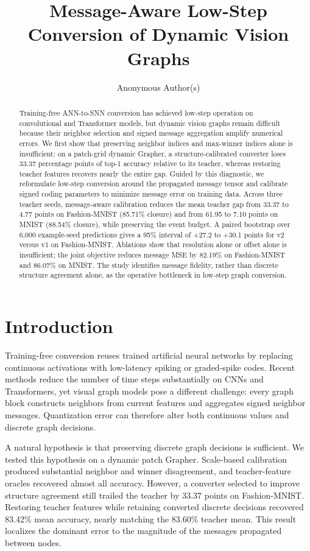 \documentclass[10pt,twocolumn]{article}
\title{Message-Aware Low-Step Conversion of Dynamic Vision Graphs}
\author{Anonymous Author(s)}
\begin{document}
\maketitle
\begin{abstract}
Training-free ANN-to-SNN conversion has achieved low-step operation on convolutional and Transformer models, but dynamic vision graphs remain difficult because their neighbor selection and signed message aggregation amplify numerical errors. We first show that preserving neighbor indices and max-winner indices alone is insufficient: on a patch-grid dynamic Grapher, a structure-calibrated converter loses 33.37 percentage points of top-1 accuracy relative to its teacher, whereas restoring teacher features recovers nearly the entire gap. Guided by this diagnostic, we reformulate low-step conversion around the propagated message tensor and calibrate signed coding parameters to minimize message error on training data. Across three teacher seeds, message-aware calibration reduces the mean teacher gap from 33.37 to 4.77 points on Fashion-MNIST (85.71\% closure) and from 61.95 to 7.10 points on MNIST (88.54\% closure), while preserving the event budget. A paired bootstrap over 6,000 example-seed predictions gives a 95\% interval of +27.2 to +30.1 points for v2 versus v1 on Fashion-MNIST. Ablations show that resolution alone or offset alone is insufficient; the joint objective reduces message MSE by 82.19\% on Fashion-MNIST and 86.07\% on MNIST. The study identifies message fidelity, rather than discrete structure agreement alone, as the operative bottleneck in low-step graph conversion.
\end{abstract}

\section{Introduction}
Training-free conversion reuses trained artificial neural networks by replacing continuous activations with low-latency spiking or graded-spike codes. Recent methods reduce the number of time steps substantially on CNNs and Transformers, yet visual graph models pose a different challenge: every graph block constructs neighbors from current features and aggregates signed neighbor messages. Quantization error can therefore alter both continuous values and discrete graph decisions.

A natural hypothesis is that preserving discrete graph decisions is sufficient. We tested this hypothesis on a dynamic patch Grapher. Scale-based calibration produced substantial neighbor and winner disagreement, and teacher-feature oracles recovered almost all accuracy. However, a converter selected to improve structure agreement still trailed the teacher by 33.37 points on Fashion-MNIST. Restoring teacher features while retaining converted discrete decisions recovered 83.42\% mean accuracy, nearly matching the 83.60\% teacher mean. This result localizes the dominant error to the magnitude of the messages propagated between nodes.
\end{document}
